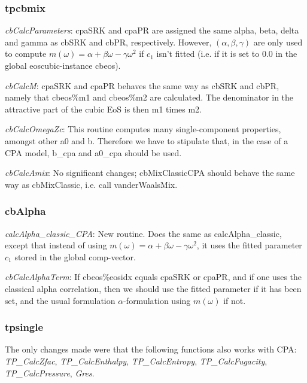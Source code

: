 \documentclass[10pt, a4paper]{article}
\begin{document}
\subsubsection*{tpcbmix}
\textit{cbCalcParameters}: cpaSRK and cpaPR are assigned the same alpha, beta, delta and gamma as cbSRK and cbPR, respectively. However, $(\alpha,\beta,\gamma)$ are only used to compute $m(\omega)=\alpha + \beta \omega - \gamma \omega^2$ if $c_1$ isn't fitted (i.e. if it is set to $0.0$ in the global eoscubic-instance cbeos).

\textit{cbCalcM}: cpaSRK and cpaPR behaves the same way as cbSRK and cbPR, namely that cbeos\%m1 and cbeos\%m2 are calculated. The denominator in the attractive part of the cubic EoS is then m1 times m2.

\textit{cbCalcOmegaZc}: This routine computes many single-component properties, amongst other a0 and b. Therefore we have to stipulate that, in the case of a CPA model, b\_cpa and a0\_cpa should be used.

\textit{cbCalcAmix}: No significant changes; cbMixClassicCPA should behave the same way as cbMixClassic, i.e. call vanderWaalsMix.

\subsubsection*{cbAlpha}

\textit{calcAlpha\_classic\_CPA}: New routine. Does the same as calcAlpha\_classic, except that instead of using $m(\omega)=\alpha + \beta \omega - \gamma \omega^2$, it uses the fitted parameter $c_1$ stored in the global comp-vector.

\textit{cbCalcAlphaTerm}: If cbeos\%eosidx equals cpaSRK or cpaPR, and if one uses the classical alpha correlation, then we should use the fitted parameter if it has been set, and the usual formulation $\alpha$-formulation using $m(\omega)$ if not.

\subsubsection*{tpsingle}
The only changes made were that the following functions also works with CPA: \textit{TP\_CalcZfac}, \textit{TP\_CalcEnthalpy}, \textit{TP\_CalcEntropy}, \textit{TP\_CalcFugacity}, \textit{TP\_CalcPressure}, \textit{Gres}.
\end{document}
